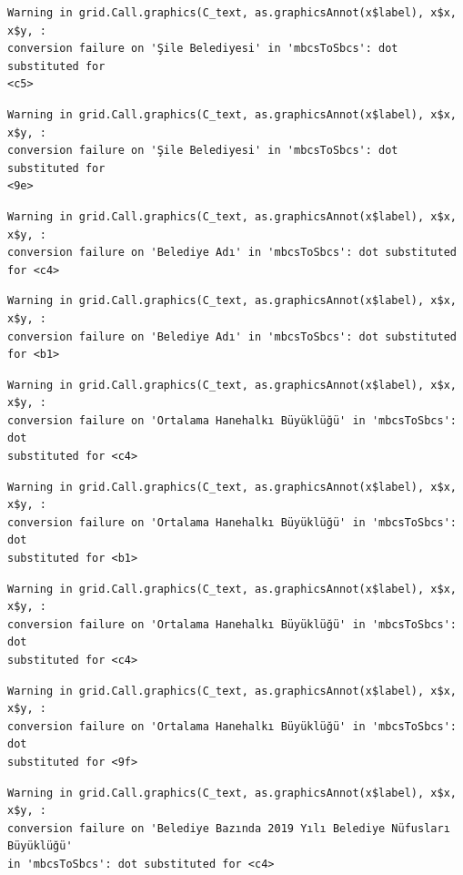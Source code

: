 \documentclass[
  11pt,
  a4paper,
  DIV=11,
  numbers=noendperiod]{scrartcl}
\begin{document}
\begin{verbatim}
Warning in grid.Call.graphics(C_text, as.graphicsAnnot(x$label), x$x, x$y, :
conversion failure on 'Şile Belediyesi' in 'mbcsToSbcs': dot substituted for
<c5>
\end{verbatim}

\begin{verbatim}
Warning in grid.Call.graphics(C_text, as.graphicsAnnot(x$label), x$x, x$y, :
conversion failure on 'Şile Belediyesi' in 'mbcsToSbcs': dot substituted for
<9e>
\end{verbatim}

\begin{verbatim}
Warning in grid.Call.graphics(C_text, as.graphicsAnnot(x$label), x$x, x$y, :
conversion failure on 'Belediye Adı' in 'mbcsToSbcs': dot substituted for <c4>
\end{verbatim}

\begin{verbatim}
Warning in grid.Call.graphics(C_text, as.graphicsAnnot(x$label), x$x, x$y, :
conversion failure on 'Belediye Adı' in 'mbcsToSbcs': dot substituted for <b1>
\end{verbatim}

\begin{verbatim}
Warning in grid.Call.graphics(C_text, as.graphicsAnnot(x$label), x$x, x$y, :
conversion failure on 'Ortalama Hanehalkı Büyüklüğü' in 'mbcsToSbcs': dot
substituted for <c4>
\end{verbatim}

\begin{verbatim}
Warning in grid.Call.graphics(C_text, as.graphicsAnnot(x$label), x$x, x$y, :
conversion failure on 'Ortalama Hanehalkı Büyüklüğü' in 'mbcsToSbcs': dot
substituted for <b1>
\end{verbatim}

\begin{verbatim}
Warning in grid.Call.graphics(C_text, as.graphicsAnnot(x$label), x$x, x$y, :
conversion failure on 'Ortalama Hanehalkı Büyüklüğü' in 'mbcsToSbcs': dot
substituted for <c4>
\end{verbatim}

\begin{verbatim}
Warning in grid.Call.graphics(C_text, as.graphicsAnnot(x$label), x$x, x$y, :
conversion failure on 'Ortalama Hanehalkı Büyüklüğü' in 'mbcsToSbcs': dot
substituted for <9f>
\end{verbatim}

\begin{verbatim}
Warning in grid.Call.graphics(C_text, as.graphicsAnnot(x$label), x$x, x$y, :
conversion failure on 'Belediye Bazında 2019 Yılı Belediye Nüfusları Büyüklüğü'
in 'mbcsToSbcs': dot substituted for <c4>
\end{verbatim}
\end{document}

